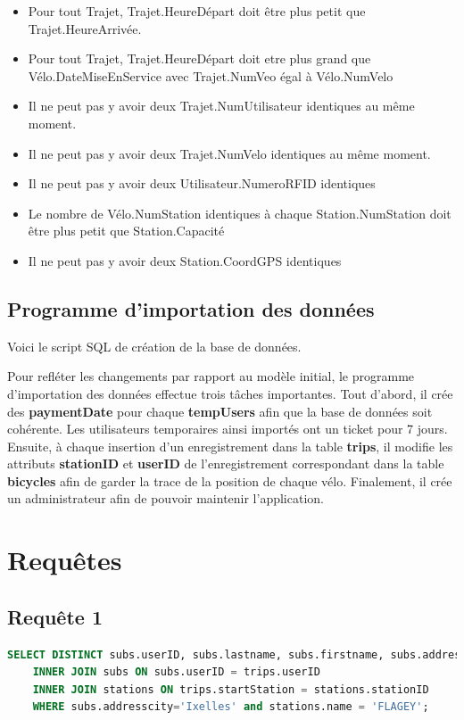 \documentclass[a4paper,11pt]{report}
\begin{document}
\begin{itemize}
\item Pour tout Trajet, Trajet.HeureDépart doit être plus petit que Trajet.HeureArrivée.
\item Pour tout Trajet, Trajet.HeureDépart doit etre plus grand que Vélo.DateMiseEnService avec Trajet.NumVeo égal à Vélo.NumVelo
\item Il ne peut pas y avoir deux Trajet.NumUtilisateur identiques au même moment.
\item Il ne peut pas y avoir deux Trajet.NumVelo identiques au même moment.
\item Il ne peut pas y avoir deux Utilisateur.NumeroRFID identiques
\item Le nombre de Vélo.NumStation identiques à chaque Station.NumStation doit être plus petit que Station.Capacité
\item Il ne peut pas y avoir deux Station.CoordGPS identiques

\end{itemize}

\section{Programme d'importation des données}

Voici le script SQL de création de la base de données.



Pour refléter les changements par rapport au modèle initial, le programme d'importation des données effectue trois tâches importantes.
Tout d'abord, il crée des \textbf{paymentDate} pour chaque \textbf{tempUsers} afin que la base de données soit cohérente. Les utilisateurs temporaires ainsi importés ont un ticket pour 7 jours.
Ensuite, à chaque insertion d'un enregistrement dans la table \textbf{trips}, il modifie les attributs \textbf{stationID} et \textbf{userID} de l'enregistrement correspondant dans la table \textbf{bicycles} afin de garder la trace de la position de chaque vélo.
Finalement, il crée un administrateur afin de pouvoir maintenir l'application.

\chapter{Requêtes}

\section{Requ\^ete 1}
    \begin{lstlisting}[language=sql]
    SELECT DISTINCT subs.userID, subs.lastname, subs.firstname, subs.addresscity, stations.name FROM trips 
    INNER JOIN subs ON subs.userID = trips.userID
    INNER JOIN stations ON trips.startStation = stations.stationID
    WHERE subs.addresscity='Ixelles' and stations.name = 'FLAGEY';
    \end{lstlisting}
\end{document}
